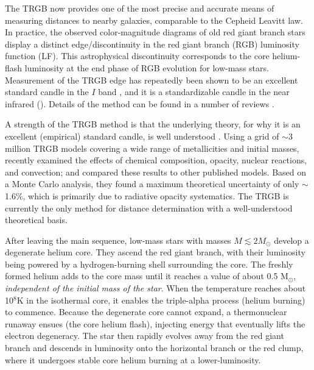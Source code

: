 \documentclass[12pt,modern]{aastex631}
\begin{document}
The TRGB now provides one of the most precise and accurate means of measuring distances to nearby galaxies, comparable to the Cepheid Leavitt law. In practice, the observed color-magnitude diagrams of old red giant branch stars display a distinct edge/discontinuity in the red giant branch (RGB) luminosity function (LF). This astrophysical discontinuity corresponds to the core helium-flash luminosity at the end phase of RGB evolution for low-mass stars. Measurement of  the TRGB edge has repeatedly been shown to be an excellent standard candle in the $I$ band \citep{lee_1993, rizzi_2007, salaris_2002, madore_2009, freedman_2019, jang_2021}, and it is a standardizable candle in the near infrared (\cite{dalcanton_2012, wu_2014, madore_2018, durbin_2020, hoyt_2025a}).  Details of the method can be found in a number of reviews \cite[e.g.,][]{madore_freedman_1999,freedman_madore_2010,beaton_2019b,madore_freedman_2023}.

A strength of the TRGB method is that the underlying theory, for why it is an excellent (empirical) standard candle, is well understood \citep{salaris_1997, Salaris_2005, bildsten_2012,kippenhahn_2013, serenelli_2017, saltas_tognelli_2022}. Using a grid of $\sim$3 million TRGB models covering a wide range of metallicities and initial masses, \citet{saltas_tognelli_2022} recently examined the effects of chemical composition, opacity, nuclear reactions, and convection; and compared these results to other published models. Based on a Monte Carlo analysis, they found a maximum theoretical uncertainty of only $\sim$1.6\%, which is primarily due to radiative opacity systematics. The TRGB is currently the only method for distance determination with a well-understood theoretical basis. 

After leaving the main sequence, low-mass stars with masses $M\lesssim 2 M_{\odot}$ develop a degenerate helium core. They ascend the red giant branch, with their luminosity being powered by a hydrogen-burning shell surrounding the core. The freshly formed helium adds to the core mass  until it reaches a  value of about 0.5 M$_{\odot}$, {\it independent of the initial mass of the star}. When the temperature reaches about 10$^8$K in the isothermal core, it enables the triple-alpha process (helium burning) to commence. Because the degenerate core cannot expand, a thermonuclear runaway ensues (the core helium flash),  injecting  energy  that eventually lifts the electron degeneracy. The star then rapidly evolves away from the red giant branch and descends in luminosity onto the  horizontal branch or the red clump, where it undergoes stable core helium burning at a lower-luminosity. 
\end{document}
